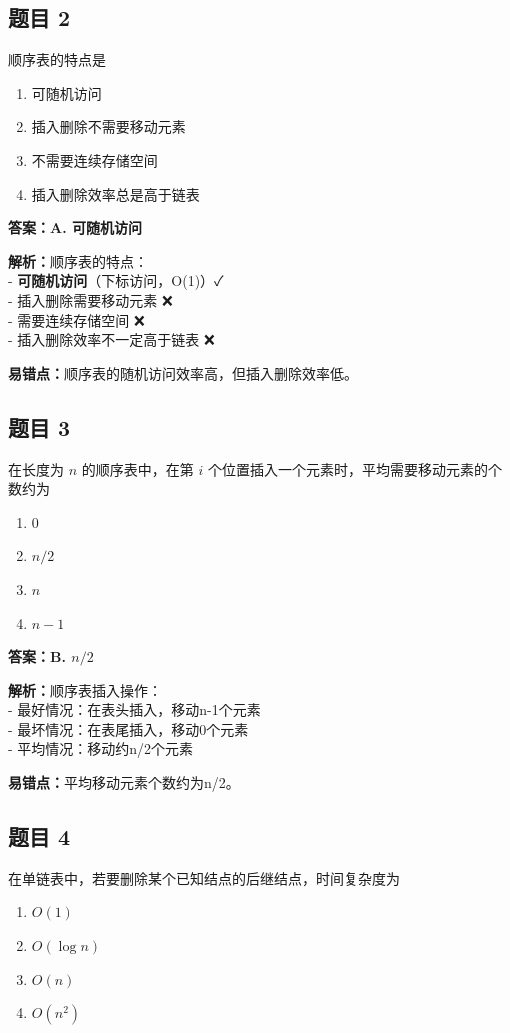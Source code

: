 \documentclass[12pt,a4paper]{ctexart}
\begin{document}
\subsection*{题目 2}
顺序表的特点是
\begin{enumerate}[label=\Alph*.]
	\item 可随机访问
	\item 插入删除不需要移动元素
	\item 不需要连续存储空间
	\item 插入删除效率总是高于链表
\end{enumerate}

\begin{answerbox}
	\textbf{答案：A. 可随机访问}

	\textbf{解析：}顺序表的特点：\\
	- \textbf{可随机访问}（下标访问，O(1)）✓\\
	- 插入删除需要移动元素 ❌\\
	- 需要连续存储空间 ❌\\
	- 插入删除效率不一定高于链表 ❌

	\textbf{易错点：}顺序表的随机访问效率高，但插入删除效率低。
\end{answerbox}

\subsection*{题目 3}
在长度为 $n$ 的顺序表中，在第 $i$ 个位置插入一个元素时，平均需要移动元素的个数约为
\begin{enumerate}[label=\Alph*.]
	\item $0$
	\item $n/2$
	\item $n$
	\item $n-1$
\end{enumerate}

\begin{answerbox}
	\textbf{答案：B. $n/2$}

	\textbf{解析：}顺序表插入操作：\\
	- 最好情况：在表头插入，移动n-1个元素\\
	- 最坏情况：在表尾插入，移动0个元素\\
	- 平均情况：移动约n/2个元素

	\textbf{易错点：}平均移动元素个数约为n/2。
\end{answerbox}

\subsection*{题目 4}
在单链表中，若要删除某个已知结点的后继结点，时间复杂度为
\begin{enumerate}[label=\Alph*.]
	\item $O(1)$
	\item $O(\log n)$
	\item $O(n)$
	\item $O(n^2)$
\end{enumerate}
\end{document}
